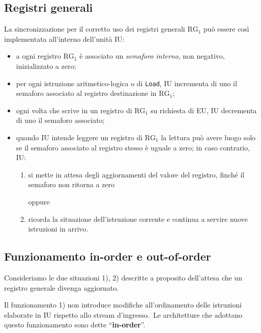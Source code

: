 \subsection{Registri generali}

La sincronizzazione per il corretto uso dei registri generali $\mathrm{RG}_1$ può essere così implementata all'interno dell'unità IU:

\begin{itemize}
    \item a ogni registro $\mathrm{RG}_1$ è associato un \textit{semaforo interno}, non negativo, inizializzato a zero;
    \item per ogni istruzione aritmetico-logica o di \texttt{Load}, IU incrementa di uno il semaforo associato al registro destinazione in $\mathrm{RG}_1$;
    \item ogni volta che scrive in un registro di $\mathrm{RG}_1$ su richiesta di EU, IU decrementa di uno il semaforo associato;
    \item quando IU intende leggere un registro di $\mathrm{RG}_1$ la lettura può avere luogo solo se il semaforo associato al registro stesso è uguale a zero; in caso contrario, IU:
          \begin{enumerate}
              \item si mette in attesa degli aggiornamenti del valore del registro, finché il semaforo non ritorna a zero
                    \begin{center}
                        oppure
                    \end{center}
              \item ricorda la situazione dell'istruzione corrente e continua a servire nuove istruzioni in arrivo.
          \end{enumerate}
\end{itemize}

\subsection{Funzionamento in-order e out-of-order}

Consideriamo le due situazioni 1), 2) descritte a proposito dell'attesa che un registro generale divenga aggiornato.

Il funzionamento 1) non introduce modifiche all'ordinamento delle istruzioni elaborate in IU rispetto allo stream d'ingresso.\
Le architetture che adottano questo funzionamento sono dette ``\textbf{in-order}''.

